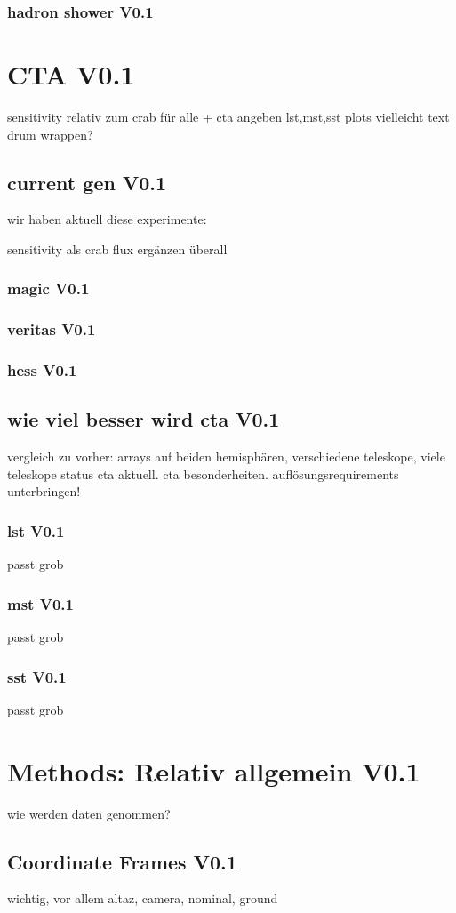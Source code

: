 \subsection{hadron shower V0.1}

\chapter{CTA V0.1}
sensitivity relativ zum crab für alle + cta angeben 
lst,mst,sst plots vielleicht text drum wrappen?
\section{current gen V0.1}
wir haben aktuell diese experimente:

sensitivity als crab flux ergänzen überall
\subsection{magic V0.1}
\subsection{veritas V0.1}
\subsection{hess V0.1}
\section{wie viel besser wird cta V0.1}
vergleich zu vorher: arrays auf beiden hemisphären, verschiedene teleskope, viele teleskope
status cta aktuell.
cta besonderheiten.
auflösungsrequirements unterbringen!
\subsection{lst V0.1}
passt grob
\subsection{mst V0.1}
passt grob
\subsection{sst V0.1}
passt grob

\chapter{Methods: Relativ allgemein V0.1}
wie werden daten genommen?
\section{Coordinate Frames V0.1}
wichtig, vor allem altaz, camera, nominal, ground
